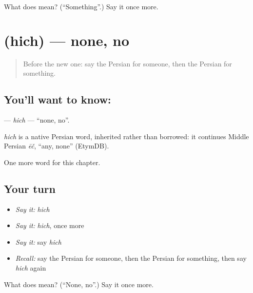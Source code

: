 \begin{tcolorbox}[breakable,colback=teal!4,colframe=teal!35!black,title={Before you move on}]
What does  mean? (\textquotedblleft{}Something\textquotedblright{}.) Say it once more.
\end{tcolorbox}
\section[\texorpdfstring{\fa{هیچ} (hich)}{هیچ (hich)}]{ (hich) — none, no}

\label{lesson:FA-C84-hich}



\begin{quote}
Before the new one: say the Persian for someone, then the Persian for something.
\end{quote}

\subsection*{You'll want to know: }
\textbf{} — \emph{hich} — \textquotedblleft{}none, no\textquotedblright{}.

\begin{cousinweb}
\emph{hich} is a native Persian word, inherited rather than borrowed: it continues Middle Persian \emph{ēč}, \textquotedblleft{}any, none\textquotedblright{} (EtymDB).
\end{cousinweb}

\begin{grammarlens}[title={What you've built}]
One more word for this chapter.
\end{grammarlens}

\subsection*{Your turn}
\begin{itemize}
\raggedright
  \item \emph{Say it:} \emph{hich}
  \item \emph{Say it:} \emph{hich}, once more
  \item \emph{Say it:} say \emph{hich}
  \item \emph{Recall:} say the Persian for someone, then the Persian for something, then say \emph{hich} again
\end{itemize}

\begin{tcolorbox}[breakable,colback=teal!4,colframe=teal!35!black,title={Before you move on}]
What does  mean? (\textquotedblleft{}None, no\textquotedblright{}.) Say it once more.
\end{tcolorbox}
